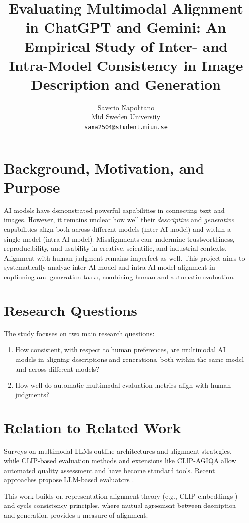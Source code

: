 \documentclass[10pt,a4paper]{article}
\title{\textbf{Evaluating Multimodal Alignment in ChatGPT and Gemini: An Empirical Study of Inter- and Intra-Model Consistency in Image Description and Generation}}
\author{Saverio Napolitano \\ Mid Sweden University \\ \texttt{sana2504@student.miun.se}}
\date{}
\begin{document}
\maketitle

\section*{Background, Motivation, and Purpose}
AI models have demonstrated powerful capabilities in connecting text and images. 
However, it remains unclear how well their \textit{descriptive} and \textit{generative} capabilities align both across different models (inter-AI model) and within a single model (intra-AI model).
Misalignments can undermine trustworthiness, reproducibility, and usability in creative, scientific, and industrial contexts.
Alignment with human judgment remains imperfect as well. 
This project aims to systematically analyze inter-AI model and intra-AI model alignment in captioning and generation tasks, combining human and automatic evaluation.

\section*{Research Questions}
The study focuses on two main research questions:
\begin{enumerate}
    \item How consistent, with respect to human preferences, are multimodal AI models in aligning descriptions and generations, both within the same model and across different models?
    \item How well do automatic multimodal evaluation metrics align with human judgments?
\end{enumerate}

\section*{Relation to Related Work}

Surveys on multimodal LLMs \cite{wu2023survey,yu2025survey} outline architectures and alignment strategies, while CLIP-based evaluation methods and extensions like CLIP-AGIQA \cite{tang2024clipagiqa} allow automated quality assessment and have become standard tools. Recent approaches propose LLM-based evaluators \cite{liu2023geval}.

This work builds on representation alignment theory (e.g., CLIP embeddings \cite{radford2021clip}) and cycle consistency principles, where mutual agreement between description and generation provides a measure of alignment.
\end{document}
